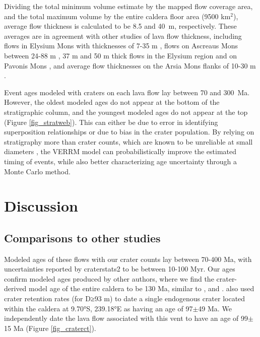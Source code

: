 \documentclass[12pt,letter]{article}
\begin{document}
Dividing the total minimum volume estimate by the mapped flow coverage area, and the total maximum volume by the entire caldera floor area (9500 km$^2$), average flow thickness is calculated to be 8.5 and 40~m, respectively. These averages are in agreement with other studies of lava flow thickness, including flows  in Elysium Mons with thicknesses of 7-35 m \citep{pasckert2012rheologies}, flows on Ascreaus Mons between 24-88 m \citep{hiesinger2007young}, 37 m and 50 m thick flows in the Elysium region and on Pavonis Mons \citep{glaze2003methodology,baloga2003rheology}, and average flow thicknesses on the Arsia Mons flanks of 10-30 m \citep{mouginis2008lava}.

Event ages modeled with craters on each lava flow lay between 70 and 300~Ma. However, the oldest modeled ages do not appear at the bottom of the stratigraphic column, and the youngest modeled ages do not appear at the top (Figure \ref{fig_stratweb}). This can either be due to error in identifying superposition relationships or due to bias in the crater population. By relying on stratigraphy more than crater counts, which are known to be unreliable at small diameters \citep[e.g.]{robbins2011volcanic,neukum2004recent}, the VERRM model can probabilistically improve the estimated timing of events, while also better characterizing age uncertainty through a Monte Carlo method.

\section{Discussion}

\subsection{Comparisons to other studies}

Modeled ages of these flows with our crater counts lay between 70-400 Ma, with uncertainties reported by craterstats2 to be between 10-100 Myr. Our ages confirm modeled ages produced by other authors, where we find the crater-derived model age of the entire caldera to be 130 Ma, similar to  \citet{neukum2004recent}, \citet{werner2009global} and \citep{robbins2011volcanic}. \citet{robbins2011volcanic} also used crater retention rates (for D≥93 m) to date a single endogenous crater located within the caldera at 9.70°S, 239.18°E as having an age of 97$\pm$49 Ma. We independently date the lava flow associated with this vent to have an age of 99$\pm$15 Ma (Figure \ref{fig_craterct}).
\end{document}

